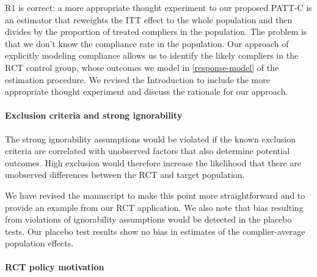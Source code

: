 \documentclass[hidelinks,12pt,letterpaper]{article}
\begin{document}
R1 is correct: a more appropriate thought experiment to our proposed PATT-C is an estimator that reweights the ITT effect to the whole population and then divides by the proportion of treated compliers in the population. The problem is that we don't know the compliance rate in the population. Our approach of explicitly modeling compliance allows us to identify the likely compliers in the RCT control group, whose outcomes we model in \ref{response-model} of the estimation procedure. We revised the Introduction to include the more appropriate thought experiment and discuss the rationale for our approach. 

\paragraph*{Exclusion criteria and strong ignorability}

The strong ignorability assumptions would be violated if the known exclusion criteria are correlated with unobserved factors that also determine potential outcomes. High exclusion would therefore increase the likelihood that there are unobserved differences between the RCT and target population.  

We have revised the manuscript to make this point more straightforward and to provide an example from our RCT application. We also note that bias resulting from violations of ignorability assumptions would be detected in the placebo tests. Our placebo test results show no bias in estimates of the complier-average population effects. 

\paragraph*{RCT policy motivation}
\end{document}
